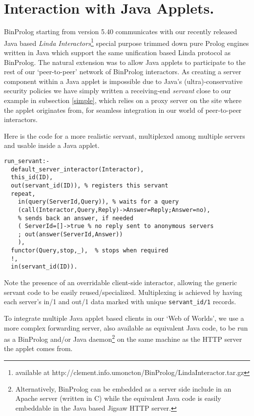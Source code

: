 \documentclass{article}
\begin{document}
\section{Interaction with Java Applets.}
BinProlog starting from version 5.40 communicates with
our recently released Java based {\em Linda Interactors}\footnote{available at http://clement.info.umoncton/BinProlog/LindaInteractor.tar.gz
} special purpose trimmed down pure Prolog engines written
in Java which support the same unification based
Linda protocol as BinProlog.
The natural extension was to allow Java applets
to participate to the rest of our `peer-to-peer'
network of BinProlog interactors.
As creating a server component within a Java applet
is impossible due to Java's (ultra)-conservative
security policies we have simply written a receiving-end 
{\em servant} close to our
example in subsection \ref{simple}, which relies on a proxy server
on the site where the applet originates from,
for seamless integration in our world of
peer-to-peer interactors.

Here is the code for a more realistic servant,
multiplexed among multiple servers and usable inside
a Java applet.


{\small \begin{verbatim}
run_servant:-
  default_server_interactor(Interactor),
  this_id(ID),
  out(servant_id(ID)), % registers this servant
  repeat,
    in(query(ServerId,Query)), % waits for a query
    (call(Interactor,Query,Reply)->Answer=Reply;Answer=no),
    % sends back an answer, if needed
    ( ServerId=[]->true % no reply sent to anonymous servers
    ; out(answer(ServerId,Answer))
    ),
  functor(Query,stop,_),  % stops when required
  !,
  in(servant_id(ID)).
\end{verbatim}}

Note the presence of an overridable client-side interactor,
allowing the generic servant code to be easily reused/specialized.
Multiplexing is achieved by having each server's in/1 and out/1
data marked with 
unique {\tt servant\_id/1} records.

To integrate multiple Java applet based clients
in our `Web of Worlds', we use a more complex
forwarding server, also available as equivalent Java
code, to be run as a BinProlog and/or Java daemon\footnote{Alternatively,
BinProlog can be embedded as a server side include in an
Apache server (written in C) while the equivalent Java code 
is easily embeddable in the Java based Jigsaw HTTP server.}
on the same machine as the HTTP server the applet comes from.
\end{document}
